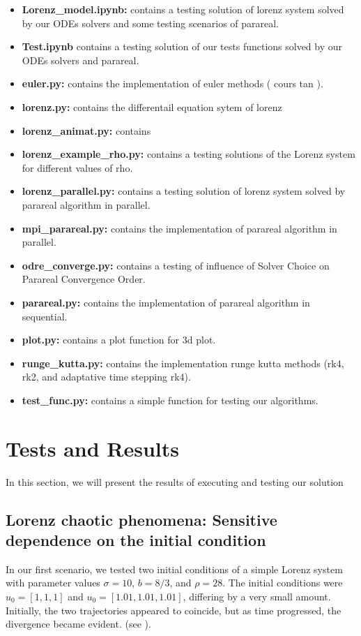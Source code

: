 \documentclass[a4paper,12pt,french]{article}
\begin{document}
\begin{itemize}
    \item \textbf{Lorenz\_model.ipynb:} contains a testing solution of lorenz system solved by our ODEs solvers and some testing scenarios of parareal.
    \item \textbf{Test.ipynb} contains a testing solution of our tests functions solved by our ODEs solvers and parareal.
    \item \textbf{euler.py:} contains the implementation of euler methods ( cours tan \cite{CoursTan}).
    \item \textbf{lorenz.py:} contains the differentail equation sytem of lorenz
    \item \textbf{lorenz\_animat.py:} contains 
    \item \textbf{lorenz\_example\_rho.py:} contains a testing solutions of the Lorenz system for different values of rho.
    \item \textbf{lorenz\_parallel.py:} contains a testing solution of lorenz system solved by parareal algorithm in parallel.
    \item \textbf{mpi\_parareal.py:} contains the implementation of parareal algorithm in parallel.
    \item \textbf{odre\_converge.py:} contains a testing of influence of Solver Choice on Parareal Convergence Order.
    \item \textbf{parareal.py:} contains the implementation of parareal algorithm in sequential.
    \item \textbf{plot.py:} contains a plot function for 3d plot.
    \item \textbf{runge\_kutta.py:} contains the implementation runge kutta methods (rk4, rk2, and adaptative time stepping rk4).
    \item \textbf{test\_func.py:} contains a simple function for testing our algorithms.
\end{itemize}

\newpage
\section{Tests and Results}
In this section, we will present the results of executing and testing our solution
\subsection{Lorenz chaotic phenomena: Sensitive dependence on the initial condition}
In our first scenario, we tested two initial conditions of a simple Lorenz system with parameter values \(\sigma = 10\), \(b = 8/3\), and \(\rho = 28\). The initial conditions were \(u_0 = [1, 1, 1]\) and \(u_0 = [1.01, 1.01, 1.01]\), differing by a very small amount. Initially, the two trajectories appeared to coincide, but as time progressed, the divergence became evident. (see ).
\end{document}
